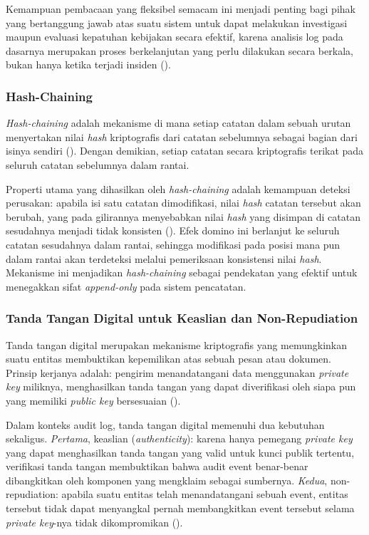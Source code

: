 Kemampuan pembacaan yang fleksibel semacam ini menjadi penting bagi pihak yang bertanggung jawab atas suatu sistem untuk dapat melakukan investigasi maupun evaluasi kepatuhan kebijakan secara efektif, karena analisis log pada dasarnya merupakan proses berkelanjutan yang perlu dilakukan secara berkala, bukan hanya ketika terjadi insiden (\cite{nist80092}).

\subsubsection{Hash-Chaining}

\textit{Hash-chaining} adalah mekanisme di mana setiap catatan dalam
sebuah urutan menyertakan nilai \textit{hash} kriptografis dari catatan
sebelumnya sebagai bagian dari isinya sendiri (\cite{islam2025logstamping}).
Dengan demikian, setiap catatan secara kriptografis terikat pada
seluruh catatan sebelumnya dalam rantai.

Properti utama yang dihasilkan oleh \textit{hash-chaining} adalah
kemampuan deteksi perusakan: apabila isi satu catatan dimodifikasi,
nilai \textit{hash} catatan tersebut akan berubah, yang pada gilirannya
menyebabkan nilai \textit{hash} yang disimpan di catatan sesudahnya
menjadi tidak konsisten (\cite{islam2025logstamping}). Efek domino ini
berlanjut ke seluruh catatan sesudahnya dalam rantai, sehingga
modifikasi pada posisi mana pun dalam rantai akan terdeteksi melalui
pemeriksaan konsistensi nilai \textit{hash}. Mekanisme ini menjadikan
\textit{hash-chaining} sebagai pendekatan yang efektif untuk menegakkan
sifat \textit{append-only} pada sistem pencatatan.

\subsubsection{Tanda Tangan Digital untuk Keaslian dan Non-Repudiation}

Tanda tangan digital merupakan mekanisme kriptografis yang memungkinkan
suatu entitas membuktikan kepemilikan atas sebuah pesan atau dokumen.
Prinsip kerjanya adalah: pengirim menandatangani data menggunakan
\textit{private key} miliknya, menghasilkan tanda tangan yang dapat
diverifikasi oleh siapa pun yang memiliki \textit{public key}
bersesuaian (\cite{shostack2014}).

Dalam konteks audit log, tanda tangan digital memenuhi dua kebutuhan
sekaligus. \textit{Pertama}, keaslian (\textit{authenticity}): karena
hanya pemegang \textit{private key} yang dapat menghasilkan tanda
tangan yang valid untuk kunci publik tertentu, verifikasi tanda tangan
membuktikan bahwa audit event benar-benar dibangkitkan oleh komponen
yang mengklaim sebagai sumbernya. \textit{Kedua}, non-repudiation:
apabila suatu entitas telah menandatangani sebuah event, entitas
tersebut tidak dapat menyangkal pernah membangkitkan event tersebut
selama \textit{private key}-nya tidak dikompromikan
(\cite{shostack2014}).

